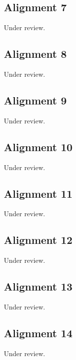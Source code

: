 \documentclass{scrartcl}
\begin{document}
\subsection{Alignment 7} %
\label{sec:align_7}
Under review.%
\clearpage

\subsection{Alignment 8} %
\label{sec:align_8}
Under review.%
\clearpage

\subsection{Alignment 9} %
\label{sec:align_9}
Under review.%
\clearpage

\subsection{Alignment 10} %
\label{sec:align_10}
Under review.%
\clearpage

\subsection{Alignment 11} %
\label{sec:align_11}
Under review.%
\clearpage

\subsection{Alignment 12} %
\label{sec:align_12}
Under review.%
\clearpage

\subsection{Alignment 13} %
\label{sec:align_13}
Under review.%
\clearpage

\subsection{Alignment 14} %
\label{sec:align_14}
Under review.%
\clearpage
\end{document}
